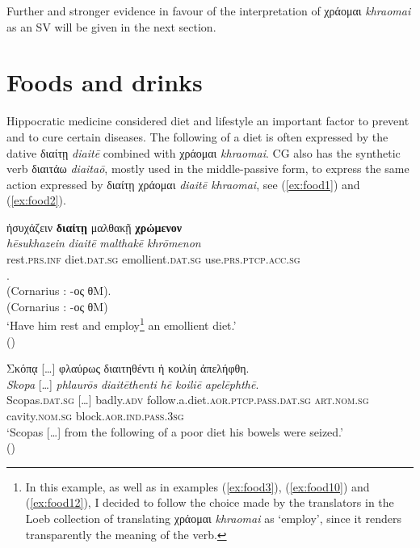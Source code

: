 \documentclass[output=paper,colorlinks,citecolor=brown]{langscibook}
\begin{document}
Further and stronger evidence in favour of the interpretation of χράομαι \textit{khraomai} as an SV will be given in the next section.

\section{Foods and drinks}
Hippocratic medicine considered diet and lifestyle an important factor to prevent and to cure certain diseases. The following of a diet is often expressed by the dative διαίτῃ \textit{diaitē} combined with χράομαι \textit{khraomai}. CG also has the synthetic verb διαιτάω \textit{diaitaō}, mostly used in the middle-passive form, to express the same action expressed by διαίτῃ χράομαι \textit{diaitē khraomai}, see (\ref{ex:food1}) and (\ref{ex:food2}). 

\begin{exe}
\ex\label{ex:food1}
\glll ἡσυχάζειν \textbf{διαίτῃ} μαλθακῇ \textbf{χρώμενον}  \\ 
\textit{hēsukhazein} \textit{diaitē} \textit{malthakē} \textit{khrōmenon} \\
rest.\textsc{prs.inf} diet.\textsc{dat.sg} emollient.\textsc{dat.sg} use.\textsc{prs.ptcp.acc.sg}  \\

. \\
{(Cornarius : -ος θΜ)}. \\
{(Cornarius : -ος θΜ)} \\
\glt ‘Have him rest and employ\footnote{In this example, as well as in examples (\ref{ex:food3}), (\ref{ex:food10}) and (\ref{ex:food12}), I decided to follow the choice made by the translators in the Loeb collection of translating χράομαι \textit{khraomai} as ‘employ', since it renders transparently the meaning of the verb.} an emollient diet.' \\
\hspace*{\fill}()
\end{exe}

\begin{exe}
\ex\label{ex:food2}
\glll Σκόπᾳ […] φλαύρως διαιτηθέντι ἡ κοιλίη ἀπελήφθη.\\ 
\textit{Skopa} […] \textit{phlaurōs} \textit{diaitēthenti} \textit{hē} \textit{koiliē} \textit{apelēphthē}.\\
Scopas.\textsc{dat.sg} […] badly.\textsc{adv} follow.a.diet.\textsc{aor.ptcp.pass.dat.sg} \textsc{art.nom.sg} cavity.\textsc{nom.sg} block.\textsc{aor.ind.pass.3sg} \\
\glt ‘Scopas […] from the following of a poor diet his bowels were seized.' \\
\hspace*{\fill}()
\end{exe}
\end{document}
